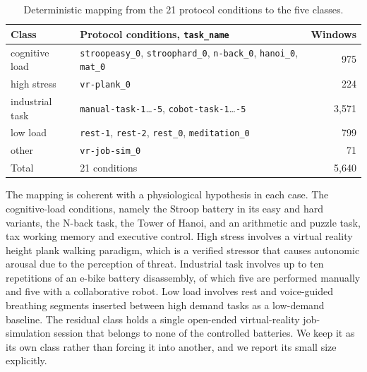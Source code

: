 \documentclass[a4paper,twoside]{article}
\begin{document}
\begin{table}[t]
    \caption{Deterministic mapping from the 21 protocol conditions to the five classes.}\label{tab:labels}
    \centering
    \footnotesize
    \begin{tabular}{@{}llr@{}}
        \toprule
        Class           & Protocol conditions, \texttt{task\_name}                                                               & Windows \\
        \midrule
        cognitive load  & \texttt{stroopeasy\_0}, \texttt{stroophard\_0}, \texttt{n-back\_0}, \texttt{hanoi\_0}, \texttt{mat\_0} & 975     \\
        high stress     & \texttt{vr-plank\_0}                                                                                   & 224     \\
        industrial task & \texttt{manual-task-1}\dots\texttt{-5}, \texttt{cobot-task-1}\dots\texttt{-5}                          & 3{,}571 \\
        low load        & \texttt{rest-1}, \texttt{rest-2}, \texttt{rest\_0}, \texttt{meditation\_0}                             & 799     \\
        other           & \texttt{vr-job-sim\_0}                                                                                 & 71      \\
        \midrule
        Total           & 21 conditions                                                                                          & 5{,}640 \\
        \bottomrule
    \end{tabular}
\end{table}

The mapping is coherent with a physiological hypothesis in each case. The cognitive-load conditions, namely the Stroop battery in its easy and hard variants, the N-back task, the Tower of Hanoi, and an arithmetic and puzzle task, tax working memory and executive control. High stress involves a virtual reality height plank walking paradigm, which is a verified stressor that causes autonomic arousal due to the perception of threat. Industrial task involves up to ten repetitions of an e-bike battery disassembly, of which five are performed manually and five with a collaborative robot. Low load involves rest and voice-guided breathing segments inserted between high demand tasks as a low-demand baseline. The residual class holds a single open-ended virtual-reality job-simulation session that belongs to none of the controlled batteries. We keep it as its own class rather than forcing it into another, and we report its small size explicitly.
\end{document}
